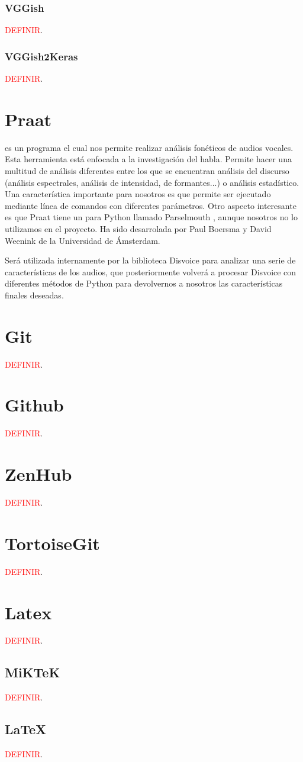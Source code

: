 \subsubsection{VGGish}
\textcolor{red}{DEFINIR}. 

\subsubsection{VGGish2Keras}
\textcolor{red}{DEFINIR}.

\section{Praat}
 \cite{praat} es un programa el cual nos permite realizar análisis fonéticos de audios vocales. Esta herramienta está enfocada a la investigación del habla. Permite hacer una multitud de análisis diferentes entre los que se encuentran análisis del discurso (análisis espectrales, análisis de intensidad, de formantes...) o análisis estadístico. Una característica importante para nosotros es que permite ser ejecutado mediante línea de comandos con diferentes parámetros. Otro aspecto interesante es que Praat tiene un  para Python llamado Parselmouth \cite{parselmouth}, aunque nosotros no lo utilizamos en el proyecto. Ha sido desarrolada por Paul Boersma y David Weenink de la Universidad de Ámsterdam.

Será utilizada internamente por la biblioteca Disvoice para analizar una serie de características de los audios, que posteriormente volverá a procesar Disvoice con diferentes métodos de Python para devolvernos a nosotros las características finales deseadas.


\section{Git}
\textcolor{red}{DEFINIR}.

\section{Github}
\textcolor{red}{DEFINIR}.

\section{ZenHub}
\textcolor{red}{DEFINIR}.

\section{TortoiseGit}
\textcolor{red}{DEFINIR}.

\section{Latex}
\textcolor{red}{DEFINIR}.

\subsection{MiKTeK}
\textcolor{red}{DEFINIR}.

\subsection{\LaTeX}
\textcolor{red}{DEFINIR}.